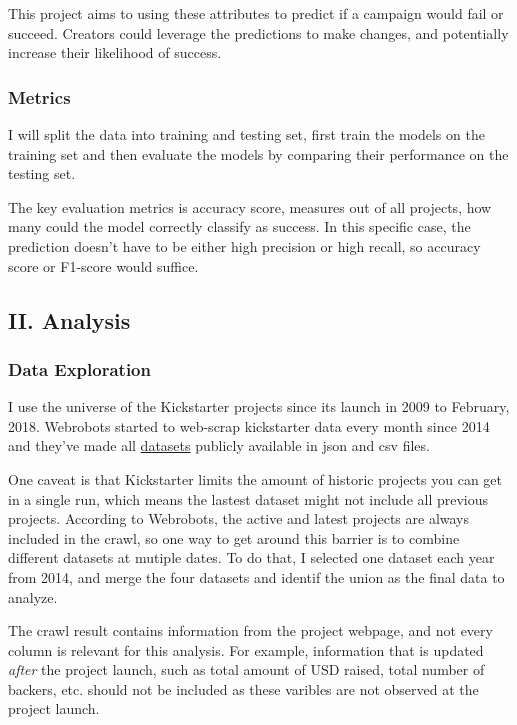 \documentclass[11pt]{article}
\begin{document}
This project aims to using these attributes to predict if a campaign
would fail or succeed. Creators could leverage the predictions to make
changes, and potentially increase their likelihood of success.

\subsubsection{Metrics}\label{metrics}

I will split the data into training and testing set, first train the
models on the training set and then evaluate the models by comparing
their performance on the testing set.

The key evaluation metrics is accuracy score, measures out of all
projects, how many could the model correctly classify as success. In
this specific case, the prediction doesn't have to be either high
precision or high recall, so accuracy score or F1-score would suffice.

\subsection{II. Analysis}\label{ii.-analysis}

\subsubsection{Data Exploration}\label{data-exploration}

I use the universe of the Kickstarter projects since its launch in 2009
to February, 2018. Webrobots started to web-scrap kickstarter data every
month since 2014 and they've made all
\href{https://webrobots.io/kickstarter-datasets/}{datasets} publicly
available in json and csv files.

One caveat is that Kickstarter limits the amount of historic projects
you can get in a single run, which means the lastest dataset might not
include all previous projects. According to Webrobots, the active and
latest projects are always included in the crawl, so one way to get
around this barrier is to combine different datasets at mutiple dates.
To do that, I selected one dataset each year from 2014, and merge the
four datasets and identif the union as the final data to analyze.

The crawl result contains information from the project webpage, and not
every column is relevant for this analysis. For example, information
that is updated \emph{after} the project launch, such as total amount of
USD raised, total number of backers, etc. should not be included as
these varibles are not observed at the project launch.
\end{document}
